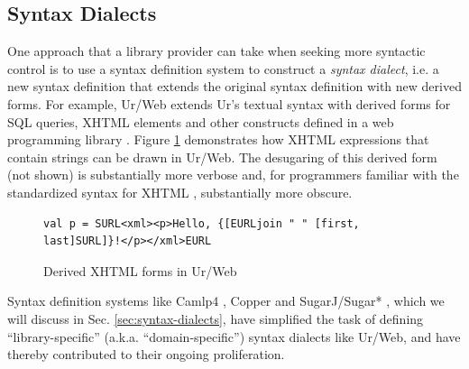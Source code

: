 \subsection{Syntax Dialects}\label{sec:problems-with-dialects}
One approach that a library provider can take when seeking more syntactic control is to use a syntax definition system to construct a \emph{syntax dialect}, i.e. a new syntax definition that extends the original syntax definition with new derived forms. 
For example, Ur/Web extends Ur's textual syntax with derived forms for SQL queries, XHTML elements and other constructs defined in a  web programming library \cite{conf/popl/Chlipala15,conf/pldi/Chlipala10}. Figure \ref{fig:urweb} demonstrates how XHTML expressions that contain strings can be drawn in Ur/Web. The desugaring of this derived form (not shown) is substantially more verbose and, for programmers familiar with the standardized syntax for XHTML \cite{xhtml}, substantially more obscure. %
\begin{figure}[h]
\begin{lstlisting}[numbers=none]
val p = SURL<xml><p>Hello, {[EURLjoin " " [first, last]SURL]}!</p></xml>EURL
\end{lstlisting}
\caption{Derived XHTML forms in Ur/Web}
\label{fig:urweb}
\end{figure}                           

Syntax definition systems like Camlp4 \cite{ocaml-manual}, Copper \cite{conf/gpce/WykS07} and SugarJ/Sugar* \cite{erdweg2011sugarj,erdweg2013framework}, which we will discuss in Sec. \ref{sec:syntax-dialects}, have simplified the task of defining ``library-specific'' (a.k.a. ``domain-specific'') syntax dialects like Ur/Web, and have thereby contributed to their ongoing proliferation.


